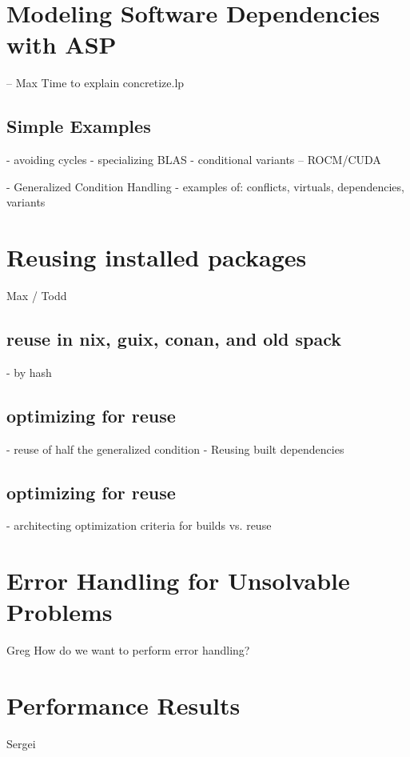 \section{Modeling Software Dependencies with ASP}
-- Max
Time to explain concretize.lp

\subsection{Simple Examples}
- avoiding cycles
- specializing BLAS
- conditional variants -- ROCM/CUDA

- Generalized Condition Handling
  - examples of: conflicts, virtuals, dependencies, variants

\section{Reusing installed packages}
Max / Todd
\subsection{reuse in nix, guix, conan, and old spack}
- by hash

\subsection{optimizing for reuse}
- reuse of half the generalized condition
- Reusing built dependencies

\subsection{optimizing for reuse}
- architecting optimization criteria for builds vs. reuse

\section{Error Handling for Unsolvable Problems}
Greg
How do we want to perform error handling?


\section{Performance Results}
Sergei


